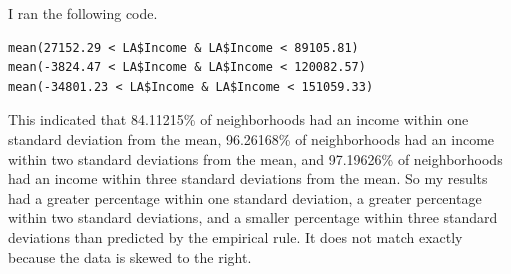 \documentclass[12pt]{article}
\begin{document}
I ran the following code.
\begin{verbatim}
mean(27152.29 < LA$Income & LA$Income < 89105.81)
mean(-3824.47 < LA$Income & LA$Income < 120082.57)
mean(-34801.23 < LA$Income & LA$Income < 151059.33)
\end{verbatim}
This indicated that 84.11215\% of neighborhoods had an income within one standard deviation from the mean,
96.26168\% of neighborhoods had an income within two standard deviations from the mean,
and 97.19626\% of neighborhoods had an income within three standard deviations from the mean. So my results
had a greater percentage within one standard deviation, a greater percentage within two standard deviations,
and a smaller percentage within three standard deviations than predicted by the empirical rule.
It does not match exactly because the data is skewed to the right.
\end{document}

